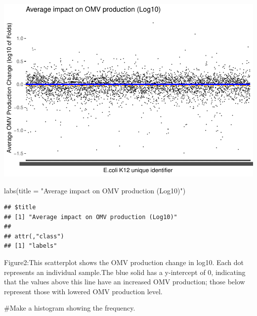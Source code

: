 \documentclass[
]{article}
\newenvironment{Shaded}{\begin{snugshade}}{\end{snugshade}}
\newcommand{\AttributeTok}[1]{\textcolor[rgb]{0.77,0.63,0.00}{#1}}
\newcommand{\FunctionTok}[1]{\textcolor[rgb]{0.00,0.00,0.00}{#1}}
\newcommand{\NormalTok}[1]{#1}
\newcommand{\StringTok}[1]{\textcolor[rgb]{0.31,0.60,0.02}{#1}}
\begin{document}
\includegraphics{OMV-analysis_files/figure-latex/figure2-1.pdf}

\begin{Shaded}
\begin{Highlighting}[]
  \FunctionTok{labs}\NormalTok{(}\AttributeTok{title =} \StringTok{"Average impact on OMV production (Log10)"}\NormalTok{)}
\end{Highlighting}
\end{Shaded}

\begin{verbatim}
## $title
## [1] "Average impact on OMV production (Log10)"
## 
## attr(,"class")
## [1] "labels"
\end{verbatim}

Figure2:This scatterplot shows the OMV production change in log10. Each
dot represents an individual sample.The blue solid has a y-intercept of
0, indicating that the values above this line have an increased OMV
production; those below represent those with lowered OMV production
level.

\#Make a histogram showing the frequency.
\end{document}
